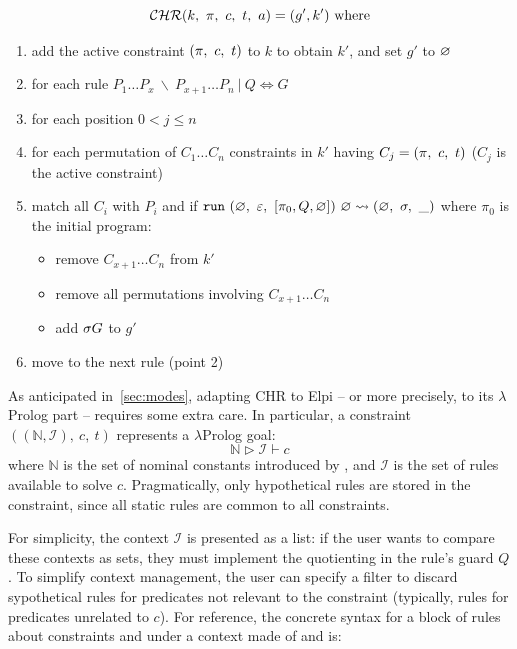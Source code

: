 \documentclass[a4paper, 11pt]{book}
\begin{document}
$$
\mathcal{CHR}(k,\ {\pi},\ c,\ t,\ a) = (g', k')\ \mathrm{where}
$$
\begin{enumerate}
\item add the active constraint $(\prog,\ c,\ t)$ to $k$ to obtain $k'$, and set $g'$ to $\varnothing$
\item for each rule $P_1 \ldots P_x\ \backslash\ P_{x+1} \ldots P_n\ |\ Q \Leftrightarrow G$
\item for each position $0 < j \leq n$
\item for each permutation of $C_1 \ldots C_n$ constraints in $k'$ having $C_j = ({\pi},\ c,\ t)$ ($C_j$ is
the active constraint)
\item match all $C_i$ with $P_i$ and if $\texttt{run}\ (\varnothing,\ \varepsilon,\ [\pi_0,Q,\varnothing])\ \varnothing \rightsquigarrow (\varnothing,\ \sigma,\ \_)$
  where $\pi_0$ is the initial program:
  \begin{itemize}
    \item remove $C_{x+1} \ldots C_n$ from $k'$
    \item remove all permutations involving $C_{x+1} \ldots C_n$
    \item add $\sigma G$ to $g'$
  \end{itemize}
\item move to the next rule (point 2)
\end{enumerate}


 As
anticipated in~\cref{sec:modes}, adapting CHR to Elpi -- or more precisely, to its
$\lambda$Prolog part -- requires some extra care. In particular, a constraint
$((\mathbb{N},\mathcal{I}),\ c,\ t)$ represents a $\lambda$Prolog goal:
$$
\mathbb{N} \triangleright  \mathcal{I} \vdash c
$$
where $\mathbb{N}$ is the set of nominal constants introduced by , and
$\mathcal{I}$ is the set of rules available to solve $c$. Pragmatically, only
hypothetical rules are stored in the constraint, since all static rules are
common to all constraints.

For simplicity, the context $\mathcal{I}$ is presented as a list: if the user
wants to compare these contexts as sets, they must implement the quotienting
in the rule's guard $Q$. To simplify context management, the user can specify a
filter to discard sypothetical rules for predicates not relevant to the constraint
(typically, rules for predicates unrelated to $c$). For reference, the concrete
syntax for a block of rules about constraints  and  under a
context made of  and  is:
\end{document}
